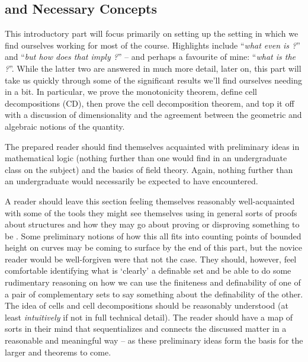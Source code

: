 % 
%
%

\begin{partbacktext}
\part{\Omy and Necessary Concepts}
\noindent This introductory part will focus primarily on setting up the setting in which we find ourselves working for most of the course. Highlights include ``\emph{what even is \omy?}'' and ``\emph{but how does that imply \pw?}'' -- and perhaps a favourite of mine: ``\emph{what is the \pwt?}''. While the latter two are answered in much more detail, later on, this part will take us quickly through some of the significant results we'll find ourselves needing in a bit. In particular, we prove the monotonicity theorem, define cell decompositions (CD), then prove the cell decomposition theorem, and top it off with a discussion of dimensionality and the agreement between the geometric and algebraic notions of the quantity.

The prepared reader should find themselves acquainted with preliminary ideas in mathematical logic (nothing further than one would find in an undergraduate class on the subject) and the basics of field theory. Again, nothing further than an undergraduate would necessarily be expected to have encountered.

A reader should leave this section feeling themselves reasonably well-acquainted with some of the tools they might see themselves using in general sorts of proofs about \om structures and how they may go about proving or disproving something to be \om. Some preliminary notions of how this all fits into counting points of bounded height on curves may be coming to surface by the end of this part, but the novice reader would be well-forgiven were that not the case. They should, however, feel comfortable identifying what is `clearly' a definable set and be able to do some rudimentary reasoning on how we can use the finiteness and definability of one of a pair of complementary sets to say something about the definability of the other. The idea of cells and cell decompositions should be reasonably understood (at least \emph{intuitively} if not in full technical detail). The reader should have a map of sorts in their mind that sequentializes and connects the discussed matter in a reasonable and meaningful way -- as these preliminary ideas form the basis for the larger \lemmas and theorems to come.

\end{partbacktext}
